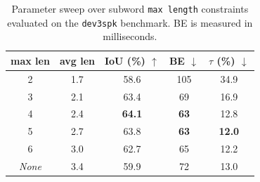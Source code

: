 \begin{table}[htbp]
\centering
\caption{Parameter sweep over subword \texttt{max length} constraints evaluated on the \texttt{dev3spk} benchmark. BE is measured in milliseconds.}
\label{tab:max_length_sweep}
\begin{tabular}{ccccc}
\toprule
\textbf{max len} & \textbf{avg len} & \textbf{IoU (\%)} $\uparrow$ & \textbf{BE} $\downarrow$ & \textbf{$\tau$  (\%)} $\downarrow$ \\
\midrule
2  & 1.7 & 58.6 & 105 & 34.9 \\
3  & 2.1 & 63.4 & 69  & 16.9 \\
4  & 2.4 & \textbf{64.1} & \textbf{63}  & 12.8 \\
5  & 2.7 & 63.8 & \textbf{63}  & \textbf{12.0} \\
6  & 3.0 & 62.7 & 65  & 12.2 \\
\midrule
\textit{None} & 3.4 & 59.9 & 72  & 13.0 \\
\bottomrule
\end{tabular}
\end{table}